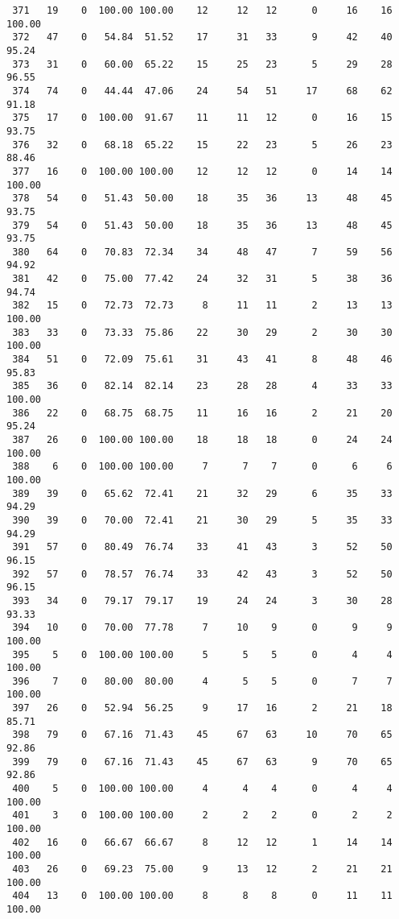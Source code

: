 \begin{verbatim}
 371   19    0  100.00 100.00    12     12   12      0     16    16   100.00
 372   47    0   54.84  51.52    17     31   33      9     42    40    95.24
 373   31    0   60.00  65.22    15     25   23      5     29    28    96.55
 374   74    0   44.44  47.06    24     54   51     17     68    62    91.18
 375   17    0  100.00  91.67    11     11   12      0     16    15    93.75
 376   32    0   68.18  65.22    15     22   23      5     26    23    88.46
 377   16    0  100.00 100.00    12     12   12      0     14    14   100.00
 378   54    0   51.43  50.00    18     35   36     13     48    45    93.75
 379   54    0   51.43  50.00    18     35   36     13     48    45    93.75
 380   64    0   70.83  72.34    34     48   47      7     59    56    94.92
 381   42    0   75.00  77.42    24     32   31      5     38    36    94.74
 382   15    0   72.73  72.73     8     11   11      2     13    13   100.00
 383   33    0   73.33  75.86    22     30   29      2     30    30   100.00
 384   51    0   72.09  75.61    31     43   41      8     48    46    95.83
 385   36    0   82.14  82.14    23     28   28      4     33    33   100.00
 386   22    0   68.75  68.75    11     16   16      2     21    20    95.24
 387   26    0  100.00 100.00    18     18   18      0     24    24   100.00
 388    6    0  100.00 100.00     7      7    7      0      6     6   100.00
 389   39    0   65.62  72.41    21     32   29      6     35    33    94.29
 390   39    0   70.00  72.41    21     30   29      5     35    33    94.29
 391   57    0   80.49  76.74    33     41   43      3     52    50    96.15
 392   57    0   78.57  76.74    33     42   43      3     52    50    96.15
 393   34    0   79.17  79.17    19     24   24      3     30    28    93.33
 394   10    0   70.00  77.78     7     10    9      0      9     9   100.00
 395    5    0  100.00 100.00     5      5    5      0      4     4   100.00
 396    7    0   80.00  80.00     4      5    5      0      7     7   100.00
 397   26    0   52.94  56.25     9     17   16      2     21    18    85.71
 398   79    0   67.16  71.43    45     67   63     10     70    65    92.86
 399   79    0   67.16  71.43    45     67   63      9     70    65    92.86
 400    5    0  100.00 100.00     4      4    4      0      4     4   100.00
 401    3    0  100.00 100.00     2      2    2      0      2     2   100.00
 402   16    0   66.67  66.67     8     12   12      1     14    14   100.00
 403   26    0   69.23  75.00     9     13   12      2     21    21   100.00
 404   13    0  100.00 100.00     8      8    8      0     11    11   100.00

\end{verbatim}
